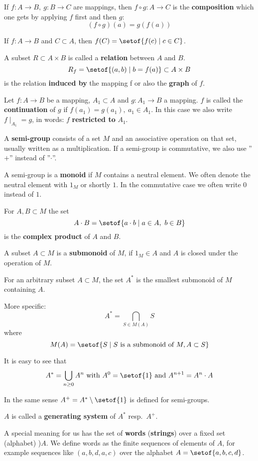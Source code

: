 If $f: A \to B,\ g : B \to C$ are mappings, then $f \circ g : A
\to C$ is the {\bf composition} which one gets by applying $f$ first and then 
$g$:
\[(f \circ g)(a) = g(f(a))\]

If $f:A \to B$ and $C \subset A$, then $f(C) = \setof{f(c) \mid c \in C }$.

A subset $R \subset A \times B$ is called a {\bf relation} between $A$ and $B$.
\[R_f = \setof{(a,b) \mid b = f(a) } \subset A \times B\] 
is the relation {\bf induced by} the mapping f or also the {\bf graph} of $f$.

Let $f : A \to B$ be a mapping, $A_1 \subset A$ and $g : A_1 \to
B$ a mapping. $f$ is called the {\bf continuation} of $g$ if $f(a_1) = g(a_1),\ 
a_1 \in A_1$. In this case we also write $f \mid _{A_1} = g$, in words: $f$ {\bf
restricted to} $A_1$.

A {\bf semi-group} consists of a set $M$ and an associative operation on that
set, usually written as a multiplication. If a semi-group is commutative, we
also use ''$+$'' instead of ''$\cdot$''.

A semi-group is a {\bf monoid} if $M$ contains a neutral element. We often
denote the neutral element with $1_M$ or shortly $1$. In the commutative case we
often write $0$ instead of $1$.

For $A,B \subset M$ the set
\[ A \cdot B = \setof{a \cdot b \mid a \in A,\ b \in B} \]
is the {\bf complex product} of $A$ and $B$.

A subset $A \subset M$ is a {\bf submonoid} of $M$, if $1_M \in A$ and $A$ is
closed under the operation of $M$.

For an arbitrary subset $A \subset M$, the set $A^*$ is the smallest submonoid
of $M$ containing $A$.

More specific:
\[ A^* = \bigcap_{S \in M(A)} S	\]
where 
\[ M(A) = \setof{S \mid S\text{ is a submonoid of }M, A \subset S} \]

It is easy to see that
\[ A^* = \bigcup_{n \geq 0} A^n\text{ with }A^0 = \setof{1}\text{ and } A^{n+1}=
A^n \cdot A \]

In the same sense $A^+ = A^* \setminus \setof{1}$ is defined for semi-groups.

$A$ is called a {\bf generating system} of $A^*$ resp.\ $A^+$.

A special meaning for us has the set of {\bf words} ({\bf strings}) over
a fixed set (alphabet) )$A$. We define words as the finite sequences
of elements of $A$, for example sequences like $(a,b,d,a,c)$ over the alphabet
$A = \setof{a,b,c,d }$.

